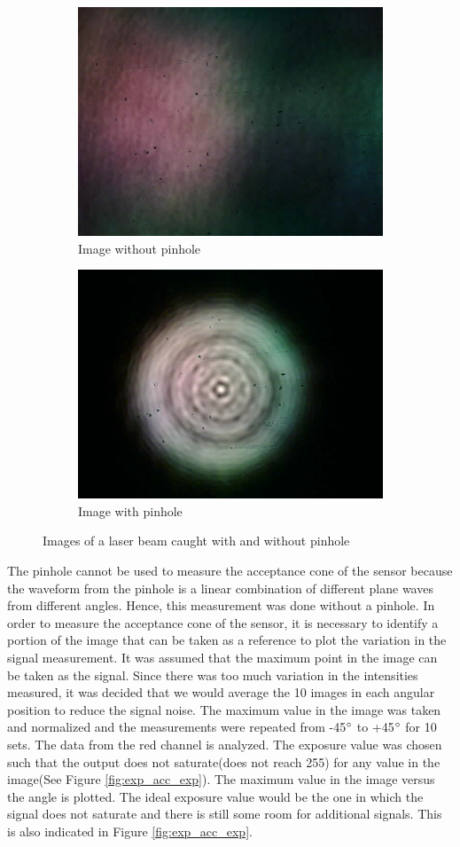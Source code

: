 \begin{figure}[ht]
    \centering
    \begin{subfigure}{0.5\textwidth}
    \centering
        \includegraphics[width=0.5\linewidth]{pics/withoutPinhole.jpg}
        \caption{Image without pinhole}
        \label{fig:nopinhole}
    \end{subfigure}%
    \begin{subfigure}{0.5\textwidth}
    \centering
        \includegraphics[width=0.5\linewidth]{pics/withPinhole.jpg}
        \caption{Image with pinhole}
        \label{fig:pinhole}
    \end{subfigure}
    \caption{Images of a laser beam caught with and without pinhole}
    \label{fig:pinholeDiff}
    \end{figure}
The pinhole cannot be used to measure the acceptance cone of the sensor because the waveform from the pinhole is a linear combination of different plane waves from different angles. Hence, this measurement was done without a pinhole. In order to measure the acceptance cone of the sensor, it is necessary to identify a portion of the image that can be taken as a reference to plot the variation in the signal measurement. It was assumed that the maximum point in the image can be taken as the signal. Since there was too much variation in the intensities measured, it was decided that we would average the 10 images in each angular position to reduce the signal noise. The maximum value in the image was taken and normalized and the measurements were repeated from -45$\degree$ to +45$\degree$ for 10 sets. The data from the red channel is analyzed. The exposure value was chosen such that the output does not saturate(does not reach 255) for any value in the image(See Figure \ref{fig:exp_acc_exp}). The maximum value in the image versus the angle is plotted. The ideal exposure value would be the one in which the signal does not saturate and there is still some room for additional signals. This is also indicated in Figure \ref{fig:exp_acc_exp}.
